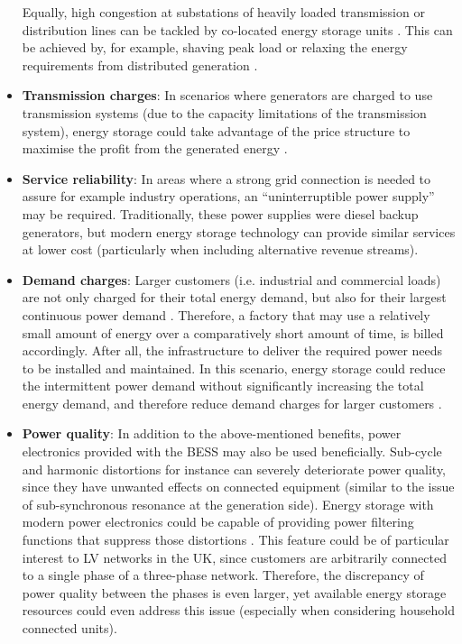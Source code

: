 \begin{itemize}
Equally, high congestion at substations of heavily loaded transmission or distribution lines can be tackled by co-located energy storage units \cite{Saez-de-Ibarra2013a, Kulkarni2005}.
This can be achieved by, for example, shaving peak load or relaxing the energy requirements from distributed generation \cite{Reihani2016, Gerards2016d}.
\item
\textbf{Transmission charges}: In scenarios where generators are charged to use transmission systems (due to the capacity limitations of the transmission system), energy storage could take advantage of the price structure to maximise the profit from the generated energy \cite{Sayer2007, Leou2012}.
\item
\textbf{Service reliability}: In areas where a strong grid connection is needed to assure for example industry operations, an ``uninterruptible power supply'' may be required.
Traditionally, these power supplies were diesel backup generators, but modern energy storage technology can provide similar services at lower cost \cite{Schoenung2001} (particularly when including alternative revenue streams).
\item
\textbf{Demand charges}: Larger customers (i.e. industrial and commercial loads) are not only charged for their total energy demand, but also for their largest continuous power demand \cite{Oudalov2007, Mackey2013}.
Therefore, a factory that may use a relatively small amount of energy over a comparatively short amount of time, is billed accordingly.
After all, the infrastructure to deliver the required power needs to be installed and maintained.
In this scenario, energy storage could reduce the intermittent power demand without significantly increasing the total energy demand, and therefore reduce demand charges for larger customers \cite{Aghaei2013}.
\item
\textbf{Power quality}: In addition to the above-mentioned benefits, power electronics provided with the BESS may also be used beneficially.
Sub-cycle and harmonic distortions for instance can severely deteriorate power quality, since they have unwanted effects on connected equipment (similar to the issue of sub-synchronous resonance at the generation side).
Energy storage with modern power electronics could be capable of providing power filtering functions that suppress those distortions \cite{Putrus2007}.
This feature could be of particular interest to LV networks in the UK, since customers are arbitrarily connected to a single phase of a three-phase network.
Therefore, the discrepancy of power quality between the phases is even larger, yet available energy storage resources could even address this issue \cite{Miret2009} (especially when considering household connected units).
\end{itemize}

